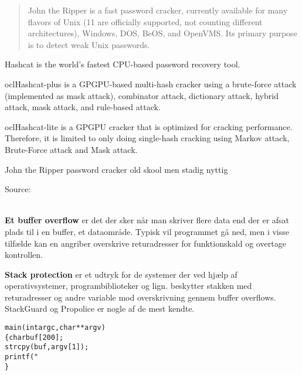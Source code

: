 \documentclass[Screen16to9,17pt]{foils}
\begin{document}


\begin{quote}
John the Ripper is a fast password cracker, currently available for
many flavors of Unix (11 are officially supported, not counting
different architectures), Windows, DOS, BeOS, and OpenVMS. Its primary
purpose is to detect weak Unix passwords.
\end{quote}

\begin{list2}
\item Hashcat is the world's fastest CPU-based password recovery tool.
\item oclHashcat-plus is a GPGPU-based multi-hash cracker using a brute-force attack (implemented as mask attack), combinator attack, dictionary attack, hybrid attack, mask attack, and rule-based attack.
\item oclHashcat-lite is a GPGPU cracker that is optimized for cracking performance. Therefore, it is limited to only doing single-hash cracking using Markov attack, Brute-Force attack and Mask attack.
\item John the Ripper password cracker old skool men stadig nyttig
\end{list2}

Source:\\
\\



\begin{list1}
\item {\bfseries Et buffer overflow}
er det der sker når man skriver flere data end der er afsat plads til
i en buffer, et dataområde. Typisk vil programmet gå ned, men i visse
tilfælde kan en angriber overskrive returadresser for funktionskald og
overtage kontrollen.
\item {\bfseries Stack protection}
er et udtryk for de systemer der ved hjælp af operativsystemer,
programbiblioteker og lign. beskytter stakken med returadresser og
andre variable mod overskrivning gennem buffer overflows. StackGuard
og Propolice er nogle af de mest kendte.
\end{list1}



\begin{alltt}\small
main(int argc, char **argv)
\{      char buf[200];
        strcpy(buf, argv[1]);
        printf("%s\textbackslash{}n",buf);
\}
\end{alltt}
\end{document}

